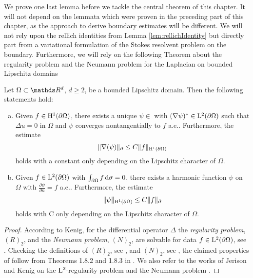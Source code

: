We prove one last lemma before we tackle the central theorem of this chapter.
It will not depend on the lemmata which were proven in the preceding part of this chapter, as the approach to derive boundary estimates will be different.
We will not rely upon the rellich identities from Lemma \ref{lem:rellichIdentity} but directly part from a variational formulation of the Stokes resolvent problem on the boundary. Furthermore, we will rely on the following Theorem about the regularity problem and the Neumann problem for the Laplacian on bounded Lipschitz domains
\begin{thm}
  \label{thm:jerisonKenig}
  Let $\Omega \subset \R^d$, $d \geq 2$, be a bounded Lipschitz domain. Then the following statements hold:
  \begin{enumerate}[a)]
    \item Given $f \in \mathrm{H}^1(\partial\Omega)$, there exists a unique $\psi \in$ with $(\nabla \psi)^* \in \mathrm{L}^2(\partial\Omega)$ such that $\Delta u = 0$ in $\Omega$ and $\psi$ converges nontangentially to $f$ a.e.. Furthermore, the estimate 
      \begin{align*}
        \|\nabla(\psi)\|_\partial \leq C \|f\|_{\mathrm{H}^1(\partial\Omega)}
      \end{align*}
      holds with a constant only depending on the Lipschitz character of $\Omega$.
    \item Given $f \in \mathrm{L}^2(\partial\Omega)$ with $\int_{\partial\Omega} f \, {\operatorname{d}\!{\sigma}} = 0$, there exists a harmonic function $\psi$ on $\Omega$ with $\frac{\partial\psi}{\partial n} = f$ a.e.. Furthermore, the estimate
      \begin{align*}
        \| \psi\|_{\mathrm{H}^1(\partial\Omega)} \leq C \|f\|_\partial
      \end{align*}
      holds with C only depending on the Lipschitz character of $\Omega$.
  \end{enumerate}
\end{thm}

\begin{proof}
  According to Kenig, for the differential operator $\Delta$ the \emph{regularity problem}, $(R)_2$, and the \emph{Neumann problem}, $(N)_2$,  are solvable for data $f \in \mathrm{L}^2(\partial\Omega)$, see \cite[Thm. 2.1.10]{kenigBook}.
  Checking the definitions of $(R)_2$, see \cite[Defn. 1.7.10]{kenigBook}, and $(N)_2$, see \cite[Defn. 1.7.9]{kenigBook}, the claimed properties of follow from Theorems 1.8.2 and 1.8.3 in \cite[Chap. 1]{kenigBook}.
  We also refer to the works of Jerison and Kenig on the $\mathrm{L}^2$-regularity problem \cite{jerisonKenig2} and the Neumann problem \cite{jerisonKenig}.
\end{proof}

